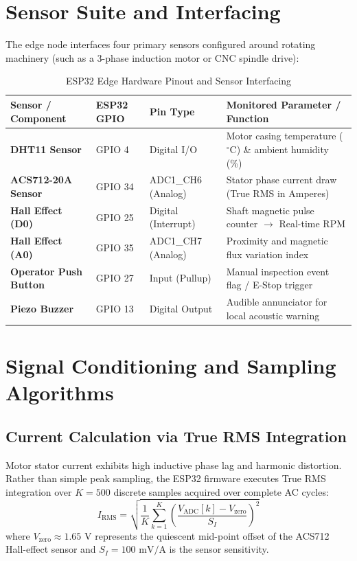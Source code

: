 \documentclass[12pt,a4paper,oneside]{report}
\begin{document}
\section{Sensor Suite and Interfacing}
The edge node interfaces four primary sensors configured around rotating machinery (such as a 3-phase induction motor or CNC spindle drive):

\begin{table}[H]
\centering
\caption{ESP32 Edge Hardware Pinout and Sensor Interfacing}
\label{tab:esp32_pinout}
\small
\begin{tabularx}{\textwidth}{p{36mm}p{24mm}p{34mm}X}
\toprule
\textbf{Sensor / Component} & \textbf{ESP32 GPIO} & \textbf{Pin Type} & \textbf{Monitored Parameter / Function} \\
\midrule
\textbf{DHT11 Sensor} & GPIO 4 & Digital I/O & Motor casing temperature ($^\circ\text{C}$) \& ambient humidity (\%) \\
\textbf{ACS712-20A Sensor} & GPIO 34 & ADC1\_CH6 (Analog) & Stator phase current draw (True RMS in Amperes) \\
\textbf{Hall Effect (D0)} & GPIO 25 & Digital (Interrupt) & Shaft magnetic pulse counter $\rightarrow$ Real-time RPM \\
\textbf{Hall Effect (A0)} & GPIO 35 & ADC1\_CH7 (Analog) & Proximity and magnetic flux variation index \\
\textbf{Operator Push Button} & GPIO 27 & Input (Pullup) & Manual inspection event flag / E-Stop trigger \\
\textbf{Piezo Buzzer} & GPIO 13 & Digital Output & Audible annunciator for local acoustic warning \\
\bottomrule
\end{tabularx}
\end{table}

\section{Signal Conditioning and Sampling Algorithms}

\subsection{Current Calculation via True RMS Integration}
Motor stator current exhibits high inductive phase lag and harmonic distortion. Rather than simple peak sampling, the ESP32 firmware executes True RMS integration over $K = 500$ discrete samples acquired over complete AC cycles:
\begin{equation}
    I_{\text{RMS}} = \sqrt{\frac{1}{K} \sum_{k=1}^K \left(\frac{V_{\text{ADC}}[k] - V_{\text{zero}}}{S_I}\right)^2}
\end{equation}
where $V_{\text{zero}} \approx 1.65\text{ V}$ represents the quiescent mid-point offset of the ACS712 Hall-effect sensor and $S_I = 100\text{ mV/A}$ is the sensor sensitivity.
\end{document}
